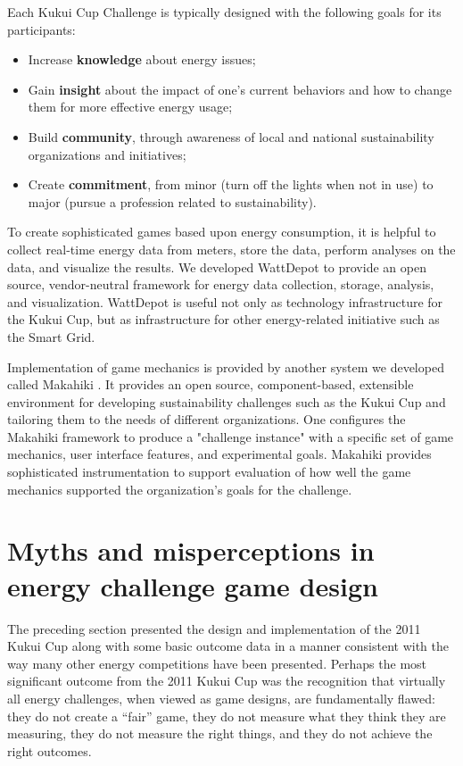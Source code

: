 \documentclass[jou]{apa} %
\begin{document}
Each Kukui Cup Challenge is typically designed with the following goals for its participants:
\begin{itemize}
\item Increase {\bf knowledge} about energy issues;
\item Gain {\bf insight} about the impact of one's current behaviors and how to change
  them for more effective energy usage;
\item Build {\bf community}, through awareness of local and national sustainability organizations and initiatives;
\item Create {\bf commitment}, from minor (turn off the lights when not in use) to major (pursue a profession related to sustainability).
\end{itemize}

To create sophisticated games based upon energy consumption, it is helpful to
collect real-time energy data from meters, store the data, perform analyses on the data, and
visualize the results. We developed WattDepot \cite{csdl2-10-05} to provide an open source, vendor-neutral
framework for energy data collection, storage, analysis, and visualization.  WattDepot is
useful not only as technology infrastructure for the Kukui Cup, but as infrastructure for
other energy-related initiative such as the Smart Grid.

Implementation of game mechanics is provided by another system we developed called
Makahiki \cite{csdl2-11-07}.  It provides an open source, component-based, extensible environment for
developing sustainability challenges such as the Kukui Cup and tailoring them to the needs
of different organizations.  One configures the Makahiki framework to produce a "challenge
instance" with a specific set of game mechanics, user interface features, and experimental
goals.  Makahiki provides sophisticated instrumentation to support evaluation of how well
the game mechanics supported the organization's goals for the challenge. 




\section{Myths and misperceptions in energy challenge game design}

The preceding section presented the design and implementation of the 2011 Kukui Cup along
with some basic outcome data in a manner consistent with the way many other energy
competitions have been presented.  Perhaps the most significant outcome from the 2011
Kukui Cup was the recognition that virtually all energy challenges, when viewed as game
designs, are fundamentally flawed: they do not create a ``fair'' game, they do not measure
what they think they are measuring, they do not measure the right things, and they do
not achieve the right outcomes. 
\end{document}
